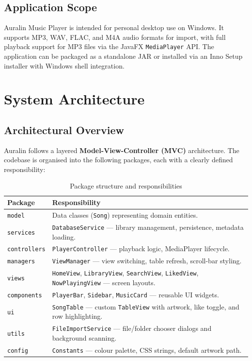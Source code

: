 ﻿\documentclass[12pt]{report}
\begin{document}
\section{Application Scope}
Auralin Music Player is intended for personal desktop use on Windows. It supports MP3, WAV, FLAC, and M4A audio formats for import, with full playback support for MP3 files via the JavaFX \texttt{MediaPlayer} API. The application can be packaged as a standalone JAR or installed via an Inno Setup installer with Windows shell integration.


\newpage
\chapter{System Architecture}

\section{Architectural Overview}
Auralin follows a layered \textbf{Model-View-Controller (MVC)} architecture. The codebase is organised into the following packages, each with a clearly defined responsibility:

\begin{table}[htbp]
\centering
\caption{Package structure and responsibilities}
\begin{tabular}{|p{4cm}|p{10cm}|}
\hline
\textbf{Package} & \textbf{Responsibility} \\ \hline
\texttt{model} & Data classes (\texttt{Song}) representing domain entities. \\ \hline
\texttt{services} & \texttt{DatabaseService} --- library management, persistence, metadata loading. \\ \hline
\texttt{controllers} & \texttt{PlayerController} --- playback logic, MediaPlayer lifecycle. \\ \hline
\texttt{managers} & \texttt{ViewManager} --- view switching, table refresh, scroll-bar styling. \\ \hline
\texttt{views} & \texttt{HomeView}, \texttt{LibraryView}, \texttt{SearchView}, \texttt{LikedView}, \texttt{NowPlayingView} --- screen layouts. \\ \hline
\texttt{components} & \texttt{PlayerBar}, \texttt{Sidebar}, \texttt{MusicCard} --- reusable UI widgets. \\ \hline
\texttt{ui} & \texttt{SongTable} --- custom \texttt{TableView} with artwork, like toggle, and row highlighting. \\ \hline
\texttt{utils} & \texttt{FileImportService} --- file/folder chooser dialogs and background scanning. \\ \hline
\texttt{config} & \texttt{Constants} --- colour palette, CSS strings, default artwork path. \\ \hline
\end{tabular}
\end{table}
\end{document}
